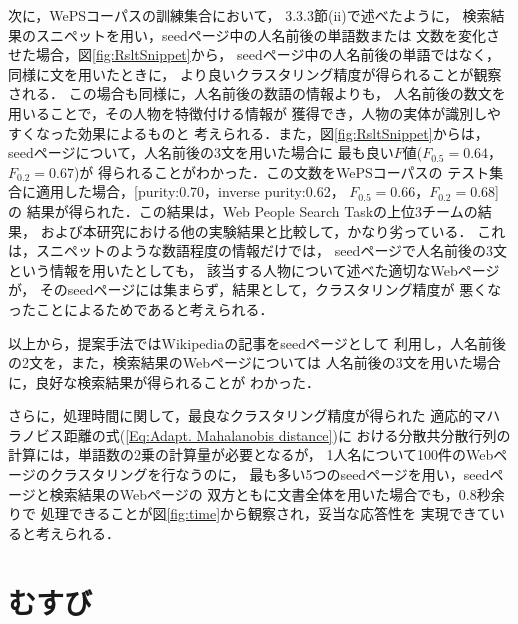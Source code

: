 \documentclass[japanese]{jnlp_1.4}
\begin{document}
次に，WePSコーパスの訓練集合において，
3.3.3節(ii)で述べたように，
検索結果のスニペットを用い，seedページ中の人名前後の単語数または
文数を変化させた場合，図\ref{fig:RsltSnippet}から，
seedページ中の人名前後の単語ではなく，同様に文を用いたときに，
より良いクラスタリング精度が得られることが観察される．
この場合も同様に，人名前後の数語の情報よりも，
人名前後の数文を用いることで，その人物を特徴付ける情報が
獲得でき，人物の実体が識別しやすくなった効果によるものと
考えられる．また，図\ref{fig:RsltSnippet}からは，
seedページについて，人名前後の3文を用いた場合に
最も良い$F$値($F_{0.5}=0.64$，$F_{0.2}=0.67$)が
得られることがわかった．この文数をWePSコーパスの
テスト集合に適用した場合，[purity:0.70，inverse purity:0.62，
$F_{0.5}=0.66$，$F_{0.2}=0.68$]の
結果が得られた．この結果は，Web People Search Taskの上位3チームの結果，
および本研究における他の実験結果と比較して，かなり劣っている．
これは，スニペットのような数語程度の情報だけでは，
seedページで人名前後の3文という情報を用いたとしても，
該当する人物について述べた適切なWebページが，
そのseedページには集まらず，結果として，クラスタリング精度が
悪くなったことによるためであると考えられる．

以上から，提案手法ではWikipediaの記事をseedページとして
利用し，人名前後の2文を，また，検索結果のWebページについては
人名前後の3文を用いた場合に，良好な検索結果が得られることが
わかった．

さらに，処理時間に関して，最良なクラスタリング精度が得られた
適応的マハラノビス距離の式(\ref{Eq:Adapt. Mahalanobis distance})に
おける分散共分散行列の計算には，単語数の2乗の計算量が必要となるが，
1人名について100件のWebページのクラスタリングを行なうのに，
最も多い5つのseedページを用い，seedページと検索結果のWebページの
双方ともに文書全体を用いた場合でも，0.8秒余りで
処理できることが図\ref{fig:time}から観察され，妥当な応答性を
実現できていると考えられる．


\section{むすび}
\label{sec:Conclusion}
\end{document}
